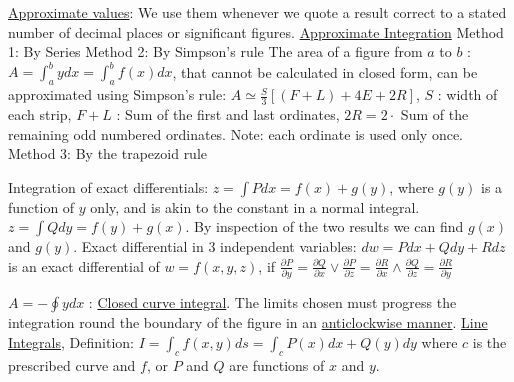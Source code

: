 \documentclass[12pt]{article}
\begin{document}
\begin{flushleft}
	\textbullet \quad \uline{Approximate values}: We use them whenever we quote a result correct to a stated number of decimal places or significant figures. \linebreak 
	\uline{Approximate Integration} \linebreak 
	\textbullet \quad Method 1: By Series \linebreak 
	\textbullet \quad Method 2: By Simpson's rule \linebreak 
	The area of a figure from $a$ to $b$  :  $\displaystyle A = \int_a^b ydx = \int_a^b f(x) dx$, that cannot be calculated in closed form, can be approximated using Simpson's rule: $\displaystyle A \simeq \frac{S}{3} \left[ (F+L) +4E +2R \right] $, $S$  :  width of each strip, $F+L$  :  Sum of the first and last ordinates, $2R = 2\cdot $ Sum of the remaining odd numbered ordinates. \linebreak 
	Note: each ordinate is used only once. \linebreak 
	\textbullet \quad Method 3: By the trapezoid rule \linebreak 
	
	\textbullet \quad Integration of exact differentials: \linebreak 
	$\displaystyle z=\int Pdx = f(x) + g(y)$, where $g(y)$ is a function of $y$ only, and is akin to the constant in a normal integral. \linebreak 
	$\displaystyle z= \int Q dy = f(y) + g(x)$. By inspection of the two results we can find $g(x)$ and $g(y)$. \linebreak 
	\textbullet \quad Exact differential in $3$ independent variables: \linebreak 
	$\displaystyle dw = P dx + Q dy + R dz$ is an exact differential of $w=f(x,y,z)$, if $\displaystyle \frac{\partial P}{\partial y} = \frac{\partial Q}{\partial x} \lor \frac{\partial P}{\partial z} = \frac{\partial R}{\partial x} \land \frac{\partial Q}{\partial z} = \frac{\partial R}{\partial y} $ \linebreak 
	
	\textbullet \quad $\displaystyle A = - \oint ydx$  :  \uline{Closed curve integral}. The limits chosen must progress the integration round the boundary of the figure in an \uline{anticlockwise manner}. \linebreak 
	\textbullet \quad \uline{Line Integrals}, Definition: $\displaystyle I = \int_c f(x,y) ds = \int_c P(x) dx + Q(y) dy$ where $c$ is the prescribed curve and $f$, or $P$ and $Q$ are functions of $x$ and $y$. \linebreak 
	

\end{flushleft}
\end{document}
